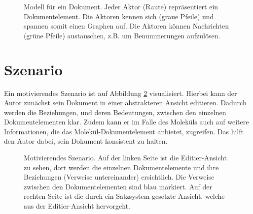 \begin{figure}[h!]
\centering
\advance\leftskip-2.5cm
\caption{ Modell für ein Dokument. Jeder Aktor (Raute) repräsentiert ein Dokumentelement. Die Aktoren kennen sich (graue Pfeile) und spannen somit einen Graphen auf. Die Aktoren können Nachrichten (grüne Pfeile) austauschen, z.B. um Benummerungen aufzulösen. }\label{idee}
\end{figure}
 
\section{Szenario}\label{}
 
Ein motivierendes Szenario ist auf Abbildung \ref{szenario} visualisiert. Hierbei kann der Autor zunächst sein Dokument in einer abstrakteren Ansicht editieren. Dadurch werden die Beziehungen, und deren Bedeutungen, zwischen den einzelnen Dokumentelementen klar. Zudem kann er im Falle des Moleküls auch auf weitere Informationen, die das Molekül-Dokumentelement anbietet, zugreifen. Das hilft den Autor dabei, sein Dokument konsistent zu halten.

 
\begin{figure}[h!]
\centering
\advance\leftskip-2.5cm
\caption{ Motivierendes Szenario. Auf der linken Seite ist die Editier-Ansicht zu sehen, dort werden die einzelnen Dokumentelemente und ihre Beziehungen (Verweise untereinander) ersichtlich. Die Verweise zwischen den Dokumentelementen sind blau markiert. Auf der rechten Seite ist die durch ein Satzsystem gesetzte Ansicht, welche aus der Editier-Ansicht hervorgeht. }\label{szenario}
\end{figure}
 
